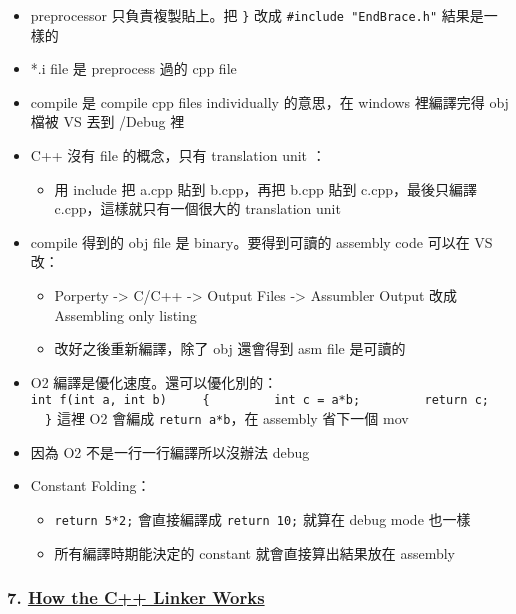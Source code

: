 \documentclass[11pt]{article}
\providecommand{\tightlist}{%
      \setlength{\itemsep}{0pt}\setlength{\parskip}{0pt}}
\begin{document}
\begin{itemize}
\tightlist
\item
  preprocessor 只負責複製貼上。把 \texttt{\}} 改成
  \texttt{\#include\ "EndBrace.h"} 結果是一樣的
\item
  *.i file 是 preprocess 過的 cpp file
\item
  compile 是 compile cpp files individually 的意思，在 windows
  裡編譯完得 obj 檔被 VS 丟到 /Debug 裡
\item
  C++ 沒有 file 的概念，只有 translation unit ：

  \begin{itemize}
  \tightlist
  \item
    用 include 把 a.cpp 貼到 b.cpp，再把 b.cpp 貼到 c.cpp，最後只編譯
    c.cpp，這樣就只有一個很大的 translation unit
  \end{itemize}
\item
  compile 得到的 obj file 是 binary。要得到可讀的 assembly code 可以在
  VS 改：

  \begin{itemize}
  \tightlist
  \item
    Porperty -\textgreater{} C/C++ -\textgreater{} Output Files
    -\textgreater{} Assumbler Output 改成 Assembling only listing
  \item
    改好之後重新編譯，除了 obj 還會得到 asm file 是可讀的
  \end{itemize}
\item
  O2 編譯是優化速度。還可以優化別的：
  \texttt{int\ f(int\ a,\ int\ b)\ \ \ \ \ \{\ \ \ \ \ \ \ \ \ int\ c\ =\ a*b;\ \ \ \ \ \ \ \ \ return\ c;\ \ \ \ \ \}}
  這裡 O2 會編成 \texttt{return\ a*b}，在 assembly 省下一個 mov
\item
  因為 O2 不是一行一行編譯所以沒辦法 debug
\item
  Constant Folding：

  \begin{itemize}
  \tightlist
  \item
    \texttt{return\ 5*2;} 會直接編譯成 \texttt{return\ 10;} 就算在 debug
    mode 也一樣
  \item
    所有編譯時期能決定的 constant 就會直接算出結果放在 assembly
  \end{itemize}
\end{itemize}

\hypertarget{how-the-c-linker-works}{%
\subsubsection{\texorpdfstring{7.
\href{https://www.youtube.com/watch?v=H4s55GgAg0I\&list=PLlrATfBNZ98dudnM48yfGUldqGD0S4FFb\&index=7}{How
the C++ Linker
Works}}{7. How the C++ Linker Works}}\label{how-the-c-linker-works}}
\end{document}

